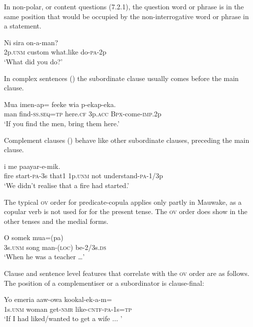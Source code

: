 In non-polar, or content questions (7.2.1), the question word or phrase is in the same position that would be occupied by the non-interrogative word or phrase in a statement.

\ea%
\label{ex:x673}
\gll Ni  sira   on-a-man? \\
2p.\textsc{unm}  custom  what.like  do-\textsc{pa}-2p      \\
\glt`What did you do?'
\z


In complex sentences () the subordinate clause usually comes before the main clause.

\ea%
\label{ex:x674}
\gll Mua  imen-ap=  feeke  wia  p-ekap-eka. \\
 man  find-\textsc{ss}.\textsc{seq}=\textsc{tp}  here.\textsc{cf}  3p.\textsc{acc}  \textsc{Bpx}-come-\textsc{imp}.2p     \\
\glt`If you find the men, bring them here.'
\z


Complement clauses () behave like other subordinate clauses, preceding the main clause. 

\ea%
\label{ex:x675}
\gll {}     i  me  paayar-e-mik. \\
fire  start-\textsc{pa}-3s  that1  1p.\textsc{unm}  not  understand-\textsc{pa}-1/3p      \\
\glt`We didn't realise that a fire had started.'
\z


The typical \textsc{ov} order for predicate-copula applies only partly in Mauwake, as a copular verb is not used for for the present tense. The \textsc{ov} order does show in the other tenses and the medial forms.

\ea%
\label{ex:x676}
\gll O  somek  mua=(pa)   \\
3s.\textsc{unm}  song  man-(\textsc{loc})  be-2/3s.\textsc{ds}      \\
\glt`When he was a teacher {\dots}'
\z


Clause and sentence level features that correlate with the \textsc{ov} order are as follows. The position of a complementiser or a subordinator is clause-final:

\ea%
\label{ex:x677}
\gll Yo  emeria  aaw-owa  kookal-ek-a-m= \\
 1s.\textsc{unm}  woman  get-\textsc{nmr}  like-\textsc{cntf}-\textsc{pa}-1s=\textsc{tp} \\
\glt`If I had liked/wanted to get a wife ...  '
\z


